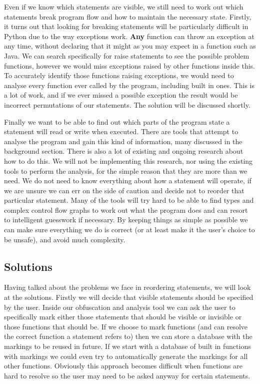 \documentclass{report}
\begin{document}
Even if we know which statements are visible, we still need to work out which statements break program flow and how to maintain the necessary state. Firstly,
it turns out that looking for breaking statements will be particularly difficult in Python due to the way exceptions work. \textbf{Any} function can throw
an exception at any time, without declaring that it might as you may expect in a function such as Java. We can search specifically for raise statements to see
the possible problem functions, however we would miss exceptions raised by other functions inside this. To accurately identify those functions raising exceptions,
we would need to analyse every function ever called by the program, including built in ones. This is a lot of work, and if we ever missed a possible exception
the result would be incorrect permutations of our statements. The solution will be discussed shortly.

Finally we want to be able to find out which parts of the program state a statement will read or write when executed. There are tools that attempt to analyse the
program and gain this kind of information, many discussed in the background section. There is also a lot of existing and ongoing research about how to do this.
We will not be implementing this research, nor using the existing tools to perform the analysis, for the simple reason that they are more than we need. We do not
need to know everything about how a statement will operate, if we are unsure we can err on the side of caution and decide not to reorder that particular statement.
Many of the tools will try hard to be able to find types and complex control flow graphs to work out what the program does and can resort to intelligent guesswork
if necessary. By keeping things as simple as possible we can make sure everything we do is correct (or at least make it the user's choice to be unsafe), and avoid
much complexity.

\subsection{Solutions}

Having talked about the problems we face in reordering statements, we will look at the solutions. Firstly we will decide that visible statements should be specified
by the user. Inside our obfuscation and analysis tool we can ask the user to specifically mark either those statements that should be visible or invisible or those
functions that should be. If we choose to mark functions (and can resolve the correct function a statement refers to) then we can store a database with the markings
to be reused in future. If we start with a database of built in functions with markings we could even try to automatically generate the markings for all other
functions. Obviously this approach becomes difficult when functions are hard to resolve so the user may need to be asked anyway for certain statements.
\end{document}
